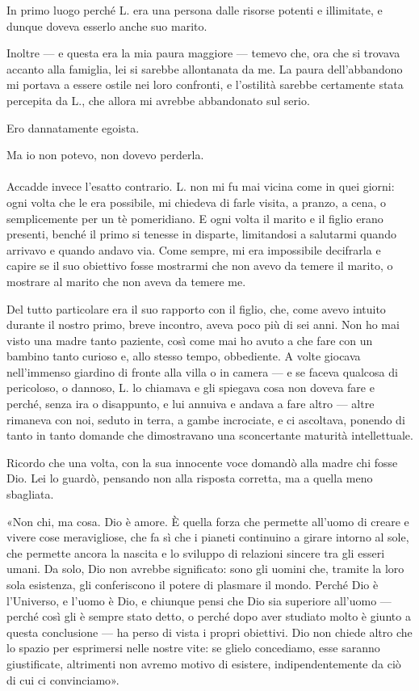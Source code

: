\documentclass[a4paper,12pt]{book}
\begin{document}
In primo luogo perché L. era una persona dalle risorse potenti e illimitate, e
dunque doveva esserlo anche suo marito.

Inoltre --- e questa era la mia paura maggiore --- temevo che, ora che si
trovava accanto alla famiglia, lei si sarebbe allontanata da me. La paura
dell'abbandono mi portava a essere ostile nei loro confronti, e l'ostilità
sarebbe certamente stata percepita da L., che allora mi avrebbe abbandonato sul
serio.

Ero dannatamente egoista.

Ma io non potevo, non dovevo perderla.

\paragraph{}
Accadde invece l'esatto contrario. L. non mi fu mai vicina come in quei giorni:
ogni volta che le era possibile, mi chiedeva di farle visita, a pranzo, a cena,
o semplicemente per un tè pomeridiano. E ogni volta il marito e il figlio erano
presenti, benché il primo si tenesse in disparte, limitandosi a salutarmi quando
arrivavo e quando andavo via. Come sempre, mi era impossibile decifrarla e
capire se il suo obiettivo fosse mostrarmi che non avevo da temere il marito, o
mostrare al marito che non aveva da temere me.

Del tutto particolare era il suo rapporto con il figlio, che, come avevo intuito
durante il nostro primo, breve incontro, aveva poco più di sei anni. Non ho mai
visto una madre tanto paziente, così come mai ho avuto a che fare con un bambino
tanto curioso e, allo stesso tempo, obbediente. A volte giocava nell'immenso
giardino di fronte alla villa o in camera --- e se faceva qualcosa di
pericoloso, o dannoso, L. lo chiamava e gli spiegava cosa non doveva fare e
perché, senza ira o disappunto, e lui annuiva e andava a fare altro --- altre
rimaneva con noi, seduto in terra, a gambe incrociate, e ci ascoltava, ponendo
di tanto in tanto domande che dimostravano una sconcertante maturità
intellettuale.

Ricordo che una volta, con la sua innocente voce domandò alla madre chi fosse
Dio. Lei lo guardò, pensando non alla risposta corretta, ma a quella meno
sbagliata.

«Non chi, ma cosa. Dio è amore. È quella forza che permette all'uomo di creare
e vivere cose meravigliose, che fa sì che i pianeti continuino a girare intorno
al sole, che permette ancora la nascita e lo sviluppo di relazioni sincere tra
gli esseri umani. Da solo, Dio non avrebbe significato: sono gli uomini che,
tramite la loro sola esistenza, gli conferiscono il potere di plasmare il mondo.
Perché Dio è l'Universo, e l'uomo è Dio, e chiunque pensi che Dio sia superiore
all'uomo --- perché così gli è sempre stato detto, o perché dopo aver studiato
molto è giunto a questa conclusione --- ha perso di vista i propri obiettivi.
Dio non chiede altro che lo spazio per esprimersi nelle nostre vite: se glielo
concediamo, esse saranno giustificate, altrimenti non avremo motivo di esistere,
indipendentemente da ciò di cui ci convinciamo».
\end{document}
